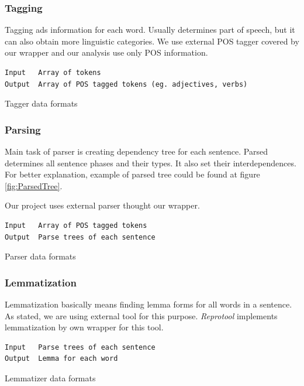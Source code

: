 \subsubsection{Tagging}
Tagging ads information for each word. Usually determines part of speech, but it can also obtain more linguistic categories. We use external POS tagger covered by our wrapper and our analysis use only POS information.

\begin{table}[ht]   %
\begin{center}
    \begin{verbatim}
Input 	Array of tokens
Output 	Array of POS tagged tokens (eg. adjectives, verbs) 
        \end{verbatim}
  \caption{Tagger data formats}
  \label{tab.tagging}
\end{center}
\end{table} 

\subsubsection{Parsing}
Main task of parser is creating dependency tree for each sentence. Parsed determines all sentence phases and their types. It also set their interdependences. For better explanation, example of parsed tree could be found at figure \ref{fig:ParsedTree}.

Our project uses external parser thought our wrapper. 

\begin{table}[ht]   %
\begin{center}
    \begin{verbatim}
Input 	Array of POS tagged tokens
Output 	Parse trees of each sentence 
        \end{verbatim}
  \caption{Parser data formats}
  \label{tab.parsing}
\end{center}
\end{table}  

\subsubsection{Lemmatization}
Lemmatization basically means finding lemma forms for all words in a sentence. As stated, we are using external tool for this purpose. \emph{Reprotool} implements lemmatization by own wrapper for this tool.
\begin{table}[ht]   %
\begin{center}
    \begin{verbatim}
Input 	Parse trees of each sentence
Output 	Lemma for each word 
        \end{verbatim}
  \caption{Lemmatizer data formats}
  \label{tab.lemmatizer}
\end{center}
\end{table} 

